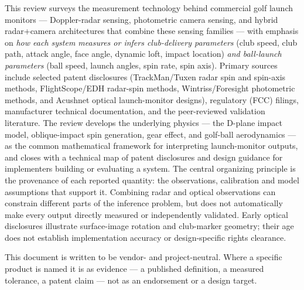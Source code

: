\noindent
This review surveys the measurement technology behind commercial golf launch
monitors --- Doppler-radar sensing, photometric camera sensing, and hybrid radar+camera architectures
that combine these sensing families --- with emphasis on \emph{how each system
measures or infers club-delivery parameters} (club speed, club path, attack
angle, face angle, dynamic loft, impact location) \emph{and ball-launch
parameters} (ball speed, launch angles, spin rate, spin axis). Primary
sources include selected patent disclosures (TrackMan/Tuxen radar spin and
spin-axis methods, FlightScope/EDH radar-spin methods,
Wintriss/Foresight photometric methods, and Acushnet optical
launch-monitor designs), regulatory (FCC) filings, manufacturer technical
documentation, and the peer-reviewed validation literature. The review
develops the underlying physics --- the D-plane impact model, oblique-impact
spin generation, gear effect, and golf-ball aerodynamics --- as the common
mathematical framework for interpreting launch-monitor outputs, and closes with a technical map of patent disclosures and design guidance for implementers building or evaluating a system.
The central organizing principle is the provenance of each reported quantity: the observations, calibration and model assumptions that support it.
Combining radar and optical observations can constrain different parts of the inference problem, but does not automatically make every output directly measured or independently validated.
Early optical disclosures illustrate surface-image rotation and club-marker geometry; their age does not establish implementation accuracy or design-specific rights clearance.

This document is written to be vendor- and project-neutral. Where a
specific product is named it is as evidence --- a published definition, a
measured tolerance, a patent claim --- not as an endorsement or a design
target.
